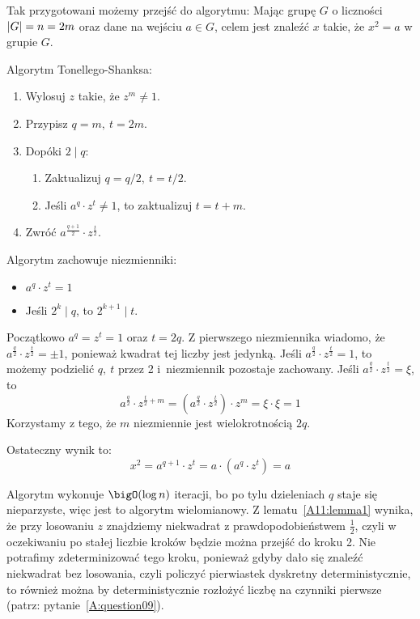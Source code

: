 Tak przygotowani możemy przejść do algorytmu: Mając grupę \( G \) o liczności \( \left\lvert G\right\rvert = n = 2m \) oraz dane na wejściu \( a \in G \), celem jest znaleźć \( x \) takie, że \( x^2 = a \) w grupie \( G \).
\begin{greyframe}
    Algorytm Tonellego-Shanksa:
    \begin{enumerate}
        \item Wylosuj \( z \) takie, że \( z^m \neq 1 \).
        \item Przypisz \( q = m, \ t = 2m \).
        \item Dopóki \( 2 \mid q \):
        \begin{enumerate}
            \item Zaktualizuj \( q = q / 2, \ t = t / 2 \).
            \item Jeśli \( a^q \cdot z^t \neq 1 \), to zaktualizuj \( t = t + m \).
        \end{enumerate}
        \item Zwróć \( a^{\frac{q+1}{2}} \cdot z^{\frac{t}{2}} \).
    \end{enumerate}
\end{greyframe}
Algorytm zachowuje niezmienniki:
\begin{itemize}
    \item \( a^q \cdot z^t = 1 \)
    \item Jeśli \( 2^k \mid q \), to \( 2^{k+1} \mid t \).
\end{itemize}
Początkowo \(a^q = z^t = 1 \) oraz \( t = 2q \).
Z pierwszego niezmiennika wiadomo, że \( a^{\frac{q}{2}} \cdot z^{\frac{t}{2}} = \pm 1 \), ponieważ kwadrat tej liczby jest jedynką.
Jeśli \( a^{\frac{q}{2}} \cdot z^{\frac{t}{2}} = 1 \), to możemy podzielić \( q, \ t \) przez 2 i~niezmiennik pozostaje zachowany.
Jeśli \( a^{\frac{q}{2}} \cdot z^{\frac{t}{2}} = \xi \), to
\[
    a^{\frac{q}{2}} \cdot z^{\frac{t}{2} + m} = (a^{\frac{q}{2}} \cdot z^{\frac{t}{2}}) \cdot z^m = \xi \cdot \xi = 1
\]
Korzystamy z tego, że \( m \) niezmiennie jest wielokrotnością \( 2q \).

Ostateczny wynik to:
\[
    x^2 = a^{q+1} \cdot z^t = a \cdot (a^q \cdot z^t) = a
\]

Algorytm wykonuje \( \bigO(\log n) \) iteracji, bo po tylu dzieleniach \( q \) staje się nieparzyste, więc jest to algorytm wielomianowy.
Z lematu~\ref{A11:lemma1} wynika, że przy losowaniu \( z \) znajdziemy niekwadrat z prawdopodobieństwem \( \frac{1}{2} \), czyli w oczekiwaniu po stałej liczbie kroków będzie można przejść do kroku 2.
Nie potrafimy zdeterminizować tego kroku, ponieważ gdyby dało się znaleźć niekwadrat bez losowania, czyli policzyć pierwiastek dyskretny deterministycznie, to również można by deterministycznie rozłożyć liczbę na czynniki pierwsze (patrz: pytanie~\ref{A:question09}).